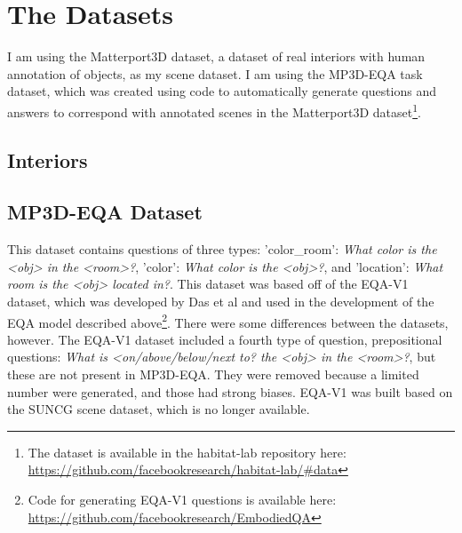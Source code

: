 

\section{The Datasets}
I am using the Matterport3D dataset, a dataset of real interiors with human annotation of objects, as my scene dataset\cite{matterport}. 
I am using the MP3D-EQA task dataset, which was created using code to automatically generate questions and answers to correspond with annotated scenes in the Matterport3D dataset\footnote{The dataset is available in the habitat-lab repository here: \url{https://github.com/facebookresearch/habitat-lab/#data}}\cite{eqa_matterport}. 


\subsection{Interiors}

\subsection{MP3D-EQA Dataset} 
This dataset contains questions of three types: 'color\_room': \emph{What color is the <obj> in the <room>?}, 'color': \emph{What color is the <obj>?}, and 'location': \emph{What room is the <obj> located in?}. This dataset was based off of the EQA-V1 dataset, which was developed by Das et al and used in the development of the EQA model described above\footnote{Code for generating EQA-V1 questions is available here: \url{https://github.com/facebookresearch/EmbodiedQA}}\cite{embodiedqa}. There were some differences between the datasets, however. The EQA-V1 dataset included a fourth type of question, prepositional questions: \emph{What is <on/above/below/next to? the <obj> in the <room>?}, but these are not present in MP3D-EQA. They were removed because a limited number were generated, and those had strong biases. %
EQA-V1 was built based on the SUNCG scene dataset, which is no longer available. %


